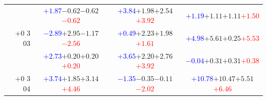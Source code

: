 \documentclass[compress]{beamer}
\begin{document}
\begin{frame}
\begin{tabular}{r | c | c | c}
          & \textcolor{blue}{$+1.87$}\hspace{0.1 cm}$-0.62$\hspace{0.1 cm}$-0.62$\hspace{0.1 cm}\textcolor{red}{$-0.62$} & \textcolor{blue}{$+3.84$}\hspace{0.1 cm}$+1.98$\hspace{0.1 cm}$+2.54$\hspace{0.1 cm}\textcolor{red}{$+3.92$} & \textcolor{blue}{$+1.19$}\hspace{0.1 cm}$+1.11$\hspace{0.1 cm}$+1.11$\hspace{0.1 cm}\textcolor{red}{$+1.50$} \\
$+$0 3 03 & \textcolor{blue}{$-2.89$}\hspace{0.1 cm}$+2.95$\hspace{0.1 cm}$-1.17$\hspace{0.1 cm}\textcolor{red}{$-2.56$} & \textcolor{blue}{$+0.49$}\hspace{0.1 cm}$+2.23$\hspace{0.1 cm}$+1.98$\hspace{0.1 cm}\textcolor{red}{$+1.61$} & \textcolor{blue}{$+4.98$}\hspace{0.1 cm}$+5.61$\hspace{0.1 cm}$+0.25$\hspace{0.1 cm}\textcolor{red}{$+5.53$} \\
          & \textcolor{blue}{$+2.73$}\hspace{0.1 cm}$+0.20$\hspace{0.1 cm}$+0.20$\hspace{0.1 cm}\textcolor{red}{$+0.20$} & \textcolor{blue}{$+3.65$}\hspace{0.1 cm}$+2.20$\hspace{0.1 cm}$+2.76$\hspace{0.1 cm}\textcolor{red}{$+3.92$} & \textcolor{blue}{$-0.04$}\hspace{0.1 cm}$+0.31$\hspace{0.1 cm}$+0.31$\hspace{0.1 cm}\textcolor{red}{$+0.38$} \\
$+$0 3 04 & \textcolor{blue}{$+3.74$}\hspace{0.1 cm}$+1.85$\hspace{0.1 cm}$+3.14$\hspace{0.1 cm}\textcolor{red}{$+4.46$} & \textcolor{blue}{$-1.35$}\hspace{0.1 cm}$-0.35$\hspace{0.1 cm}$-0.11$\hspace{0.1 cm}\textcolor{red}{$-2.02$} & \textcolor{blue}{$+10.78$}\hspace{0.1 cm}$+10.47$\hspace{0.1 cm}$+5.51$\hspace{0.1 cm}\textcolor{red}{$+6.46$} \\

\end{tabular}
\end{frame}
\end{document}

